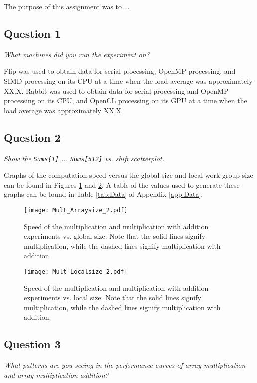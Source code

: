 \documentclass{article}
\begin{document}
The purpose of this assignment was to ...

\subsection*{Question 1}
\textit{What machines did you run the experiment on?}

Flip was used to obtain data for serial processing, OpenMP processing, and SIMD processing on its CPU at a time when the load average was approximately XX.X.  Rabbit was used to obtain data for serial processing and OpenMP processing on its CPU, and OpenCL processing on its GPU at a time when the load average was approximately XX.X

\subsection*{Question 2}
\textit{Show the \texttt{Sums[1]} ... \texttt{Sums[512]} vs. shift scatterplot.}






Graphs of the computation speed versus the global size and local work group size can be found in Figures \ref{fig:MultGlobal} and \ref{fig:MultLocal}.  A table of the values used to generate these graphs can be found in Table \ref{tab:Data} of Appendix \ref{app:Data}.
\begin{figure}[h!]
	\centering
        \texttt{[image: Mult\_Arraysize\_2.pdf]}
        \caption{Speed of the multiplication and multiplication with addition experiments vs. global size.  Note that the solid lines signify multiplication, while the dashed lines signify multiplication with addition.}
        \label{fig:MultGlobal}
\end{figure}
\begin{figure}[h!]
	\centering
        \texttt{[image: Mult\_Localsize\_2.pdf]}
        \caption{Speed of the multiplication and multiplication with addition experiments vs. local size.  Note that the solid lines signify multiplication, while the dashed lines signify multiplication with addition.}
        \label{fig:MultLocal}
\end{figure}

\newpage

\subsection*{Question 3}
\textit{What patterns are you seeing in the performance curves of array multiplication and array multiplication-addition?}
\end{document}
